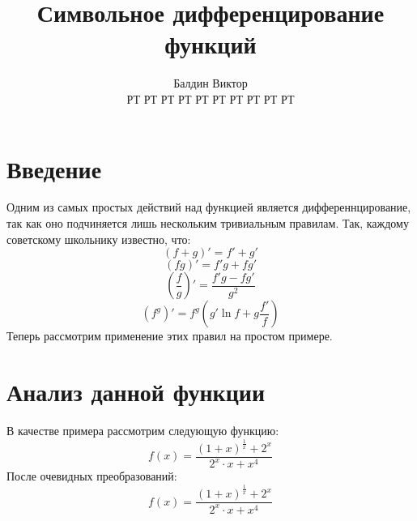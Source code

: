 \documentclass{article}
\title{Символьное дифференцирование функций}
\author{Балдин Виктор\\РТ РТ РТ РТ РТ РТ РТ РТ РТ РТ}
\begin{document}
\maketitle
\section{Введение}
Одним из самых простых действий над функцией является дифференнцирование, так как оно подчиняется лишь нескольким тривиальным правилам. Так, каждому советскому школьнику известно, что:
$$(f+g)'=f'+g'$$
$$(fg)' =f'g+fg'$$
$$\left(\frac{f}{g}\right)'=\frac{f'g-fg'}{g^2}$$
$$(f^g)'=f^g\left(g'\ln f+g\frac{f'}{f}\right)$$Теперь рассмотрим применение этих правил на простом примере.\section{Анализ данной функции}
В качестве примера рассмотрим следующую функцию:
$$f(x)=\frac{\left(1+x\right)^{\frac{1}{x}}+2^{x}}{2^{x} \cdot x+x^{4}}$$
После очевидных преобразований:$$f(x)=\frac{\left(1+x\right)^{\frac{1}{x}}+2^{x}}{2^{x} \cdot x+x^{4}}$$
\end{document}
